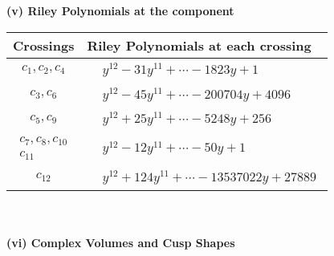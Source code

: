 \documentclass[1p]{elsarticle_modified}
\theoremstyle{definition}
\begin{document}
\newpage\renewcommand{\arraystretch}{1}
\flushleft \textbf{(v) Riley Polynomials at the component}\newline \\
\begin{tabular}{m{50pt}|m{274pt}}
Crossings & \hspace{64pt}Riley Polynomials at each crossing \\
\hline $$\begin{aligned}c_{1},c_{2},c_{4}\end{aligned}$$&$\begin{aligned}
&y^{12}-31 y^{11}+\cdots-1823 y+1
\end{aligned}$\\
\hline $$\begin{aligned}c_{3},c_{6}\end{aligned}$$&$\begin{aligned}
&y^{12}-45 y^{11}+\cdots-200704 y+4096
\end{aligned}$\\
\hline $$\begin{aligned}c_{5},c_{9}\end{aligned}$$&$\begin{aligned}
&y^{12}+25 y^{11}+\cdots-5248 y+256
\end{aligned}$\\
\hline $$\begin{aligned}c_{7},c_{8},c_{10}\\c_{11}\end{aligned}$$&$\begin{aligned}
&y^{12}-12 y^{11}+\cdots-50 y+1
\end{aligned}$\\
\hline $$\begin{aligned}c_{12}\end{aligned}$$&$\begin{aligned}
&y^{12}+124 y^{11}+\cdots-13537022 y+27889
\end{aligned}$\\
\hline
\end{tabular}\\~\\
\newpage\flushleft \textbf{(vi) Complex Volumes and Cusp Shapes}
\end{document}
